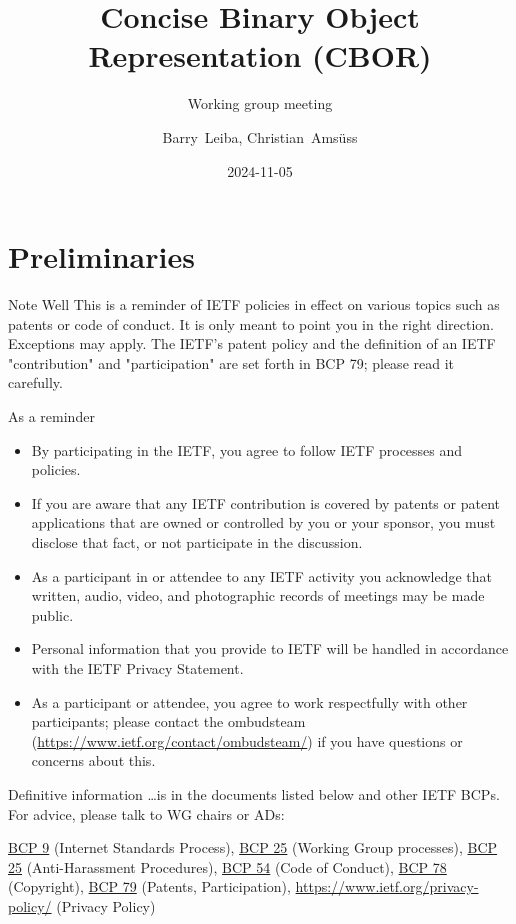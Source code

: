 \documentclass[aspectratio=169]{beamer}
\title{Concise Binary Object Representation (CBOR)}
\subtitle{Working group meeting}
\author{Barry~Leiba, Christian~Amsüss}
\institute{\normalsize{\theietf, Dublin}}
\date{2024-11-05}
\begin{document}
\frame{\titlepage}

\section*{Preliminaries}

\begin{frame}{Note Well}\scriptsize
This is a reminder of IETF policies in effect on various topics such as patents or code of conduct. It is only meant to point you in the right direction. Exceptions may apply. The IETF's patent policy and the definition of an IETF "contribution" and "participation" are set forth in BCP 79; please read it carefully.

    \begin{block}{\small As a reminder\qquad\mbox{}}

    \vspace{-1.65em}

    \begin{itemize}
        \item By participating in the IETF, you agree to follow IETF processes and policies.
        \item If you are aware that any IETF contribution is covered by patents or patent applications that are owned or controlled by you or your sponsor, you must disclose that fact, or not participate in the discussion.
        \item As a participant in or attendee to any IETF activity you acknowledge that written, audio, video, and photographic records of meetings may be made public.
        \item Personal information that you provide to IETF will be handled in accordance with the IETF Privacy Statement.
        \item As a participant or attendee, you agree to work respectfully with other participants; please contact the ombudsteam (\url{https://www.ietf.org/contact/ombudsteam/}) if you have questions or concerns about this.
    \end{itemize}

    \end{block}

    \vspace{-1em}
    \begin{block}{\small Definitive information}
\ldots is in the documents listed below and other IETF BCPs. For advice, please talk to WG chairs or ADs:

\href{https://www.rfc-editor.org/info/bcp9}{BCP 9} (Internet Standards Process),
\href{https://www.rfc-editor.org/info/bcp25}{BCP 25} (Working Group processes),
\href{https://www.rfc-editor.org/info/bcp25}{BCP 25} (Anti-Harassment Procedures),
\href{https://www.rfc-editor.org/info/bcp54}{BCP 54} (Code of Conduct),
\href{https://www.rfc-editor.org/info/bcp78}{BCP 78} (Copyright),
\href{https://www.rfc-editor.org/info/bcp79}{BCP 79} (Patents, Participation),
\url{https://www.ietf.org/privacy-policy/} (Privacy Policy)
    \end{block}
\end{frame}
\end{document}

